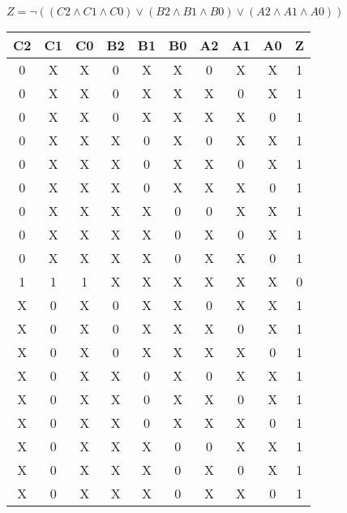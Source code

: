 \begin{center}
    {\(Z = \lnot ((C2 \land C1 \land C0) \lor (B2 \land B1 \land B0) \lor (A2 \land A1 \land A0)) \)}
    \begin{table}[h] %
        \begin{center}
            \begin{tabular}{|c|c|c|c|c|c|c|c|c||c|} \hline
            C2 & C1 & C0 & B2 & B1 & B0 & A2 & A1 & A0 & Z \\ \hline\hline
            0  & X  & X  & 0  & X  & X  & 0  & X  & X  & 1 \\ \hline
            0  & X  & X  & 0  & X  & X  & X  & 0  & X  & 1 \\ \hline
            0  & X  & X  & 0  & X  & X  & X  & X  & 0  & 1 \\ \hline
            0  & X  & X  & X  & 0  & X  & 0  & X  & X  & 1 \\ \hline
            0  & X  & X  & X  & 0  & X  & X  & 0  & X  & 1 \\ \hline
            0  & X  & X  & X  & 0  & X  & X  & X  & 0  & 1 \\ \hline
            0  & X  & X  & X  & X  & 0  & 0  & X  & X  & 1 \\ \hline
            0  & X  & X  & X  & X  & 0  & X  & 0  & X  & 1 \\ \hline
            0  & X  & X  & X  & X  & 0  & X  & X  & 0  & 1 \\ \hline
            1  & 1  & 1  & X  & X  & X  & X  & X  & X  & 0 \\ \hline
            X  & 0  & X  & 0  & X  & X  & 0  & X  & X  & 1 \\ \hline
            X  & 0  & X  & 0  & X  & X  & X  & 0  & X  & 1 \\ \hline
            X  & 0  & X  & 0  & X  & X  & X  & X  & 0  & 1 \\ \hline
            X  & 0  & X  & X  & 0  & X  & 0  & X  & X  & 1 \\ \hline
            X  & 0  & X  & X  & 0  & X  & X  & 0  & X  & 1 \\ \hline
            X  & 0  & X  & X  & 0  & X  & X  & X  & 0  & 1 \\ \hline
            X  & 0  & X  & X  & X  & 0  & 0  & X  & X  & 1 \\ \hline
            X  & 0  & X  & X  & X  & 0  & X  & 0  & X  & 1 \\ \hline
            X  & 0  & X  & X  & X  & 0  & X  & X  & 0  & 1 \\ \hline

\end{tabular}
\end{center}
\end{table}
\end{center}
